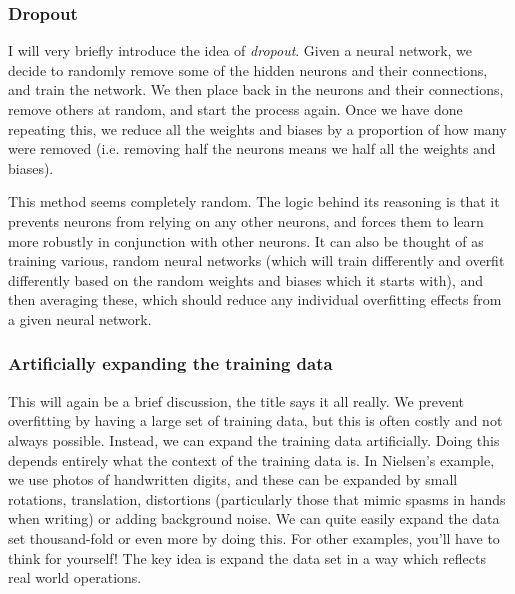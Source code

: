 \documentclass[10pt]{article}
\begin{document}
\subsubsection{Dropout}
I will very briefly introduce the idea of \textit{dropout}. Given a neural network, we decide to randomly remove some of the hidden neurons and their connections, and train the network. We then place back in the neurons and their connections, remove others at random, and start the process again. Once we have done repeating this, we reduce all the weights and biases by a proportion of how many were removed (i.e. removing half the neurons means we half all the weights and biases).\par
This method seems completely random. The logic behind its reasoning is that it prevents neurons from relying on any other neurons, and forces them to learn more robustly in conjunction with other neurons. It can also be thought of as training various, random neural networks (which will train differently and overfit differently based on the random weights and biases which it starts with), and then averaging these, which should reduce any individual overfitting effects from a given neural network.

\subsubsection{Artificially expanding the training data}
This will again be a brief discussion, the title says it all really. We prevent overfitting by having a large set of training data, but this is often costly and not always possible. Instead, we can expand the training data artificially. Doing this depends entirely what the context of the training data is. In Nielsen's example, we use photos of handwritten digits, and these can be expanded by small rotations, translation, distortions (particularly those that mimic spasms in hands when writing) or adding background noise. We can quite easily expand the data set thousand-fold or even more by doing this. For other examples, you'll have to think for yourself! The key idea is expand the data set in a way which reflects real world operations.
\end{document}
